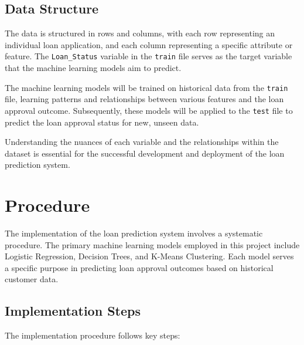 \documentclass[10pt]{article}
\begin{document}
\subsection*{Data Structure}

The data is structured in rows and columns, with each row representing an individual loan application, and each column representing a specific attribute or feature. The \texttt{Loan\_Status} variable in the \texttt{train} file serves as the target variable that the machine learning models aim to predict.

The machine learning models will be trained on historical data from the \texttt{train} file, learning patterns and relationships between various features and the loan approval outcome. Subsequently, these models will be applied to the \texttt{test} file to predict the loan approval status for new, unseen data.

Understanding the nuances of each variable and the relationships within the dataset is essential for the successful development and deployment of the loan prediction system.

\section*{Procedure}

The implementation of the loan prediction system involves a systematic procedure. The primary machine learning models employed in this project include Logistic Regression, Decision Trees, and K-Means Clustering. Each model serves a specific purpose in predicting loan approval outcomes based on historical customer data.

\subsection*{Implementation Steps}

The implementation procedure follows key steps:
\end{document}
